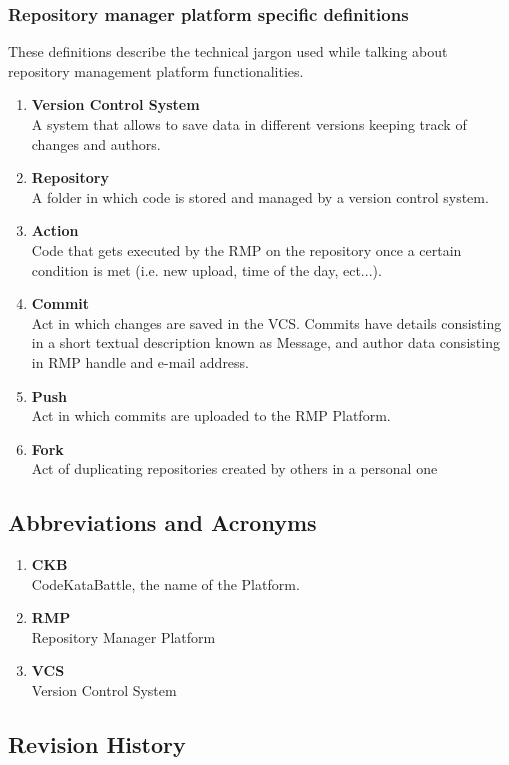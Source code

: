 \subsubsection[short]{Repository manager platform specific definitions}
These definitions describe the technical jargon used while talking about repository management platform functionalities.
\begin{enumerate}[label=$\bullet$]
    \item \textbf{Version Control System}\\A system that allows to save data in different versions keeping track of changes and authors.
    \item \textbf{Repository}\\A folder in which code is stored and managed by a version control system.
    \item \textbf{Action}\\Code that gets executed by the RMP on the repository once a certain condition is met (i.e. new upload, time of the day, ect...).
    \item \textbf{Commit}\\Act in which changes are saved in the VCS. Commits have details consisting in a short textual description known as Message, and author data consisting in RMP handle and e-mail address.
    \item \textbf{Push}\\Act in which commits are uploaded to the RMP Platform.
    \item \textbf{Fork}\\Act of duplicating repositories created by others in a personal one
\end{enumerate}
\subsection{Abbreviations and Acronyms}
\begin{enumerate}[label=$\bullet$]
    \item \textbf{CKB}\\CodeKataBattle, the name of the Platform.
    \item \textbf{RMP}\\Repository Manager Platform
    \item \textbf{VCS}\\Version Control System
\end{enumerate}

\subsection{Revision History}

